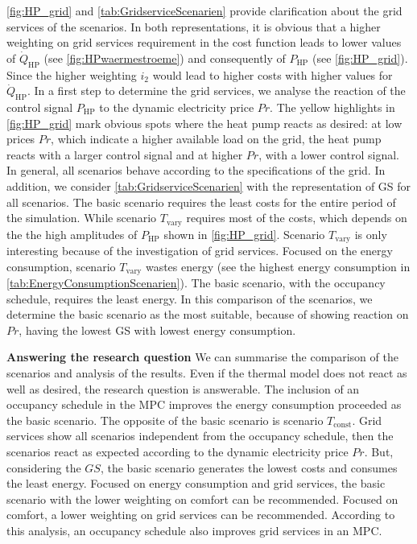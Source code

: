 \autoref{fig:HP_grid} and \autoref{tab:GridserviceScenarien} provide clarification about the grid services of the scenarios. In both representations, it is obvious that a higher weighting on grid services requirement in the cost function leads to lower values of $\dot{Q}_\text{HP}$ (see \autoref{fig:HPwaermestroeme}) and consequently of $P_\text{HP}$ (see \autoref{fig:HP_grid}). Since the higher weighting $i_\text{2}$ would lead to higher costs with higher values for $\dot{Q}_\text{HP}$. In a first step to determine the grid services, we analyse the reaction of the control signal $P_\text{HP}$ to the dynamic electricity price $Pr$. The yellow highlights in \autoref{fig:HP_grid} mark obvious spots where the heat pump reacts as desired: at low prices $Pr$, which indicate a higher available load on the grid, the heat pump reacts with a larger control signal and at higher $Pr$, with a lower control signal. In general, all scenarios behave according to the specifications of the grid. In addition, we consider \autoref{tab:GridserviceScenarien} with the representation of GS for all scenarios. The basic scenario requires the least costs for the entire period of the simulation. While scenario $T_\text{vary}$ requires most of the costs, which depends on the the high amplitudes of $P_\text{HP}$ shown in \autoref{fig:HP_grid}. Scenario $T_\text{vary}$ is only interesting because of the investigation of grid services. Focused on the energy consumption, scenario $T_\text{vary}$ wastes energy (see the highest energy consumption in \autoref{tab:EnergyConsumptionScenarien}). The basic scenario, with the occupancy schedule, requires the least energy. In this comparison of the scenarios, we determine the basic scenario as the most suitable, because of showing reaction on $Pr$, having the lowest GS with lowest energy consumption.\newline

\textbf{Answering the research question}\newline
We can summarise the comparison of the scenarios and analysis of the results. Even if the thermal model does not react as well as desired, the research question is answerable. The inclusion of an occupancy schedule in the MPC improves the energy consumption proceeded as the basic scenario. The opposite of the basic scenario is scenario $T_\text{const}$. Grid services show all scenarios independent from the occupancy schedule, then the scenarios react as expected according to the dynamic electricity price $Pr$. But, considering the $GS$, the basic scenario generates the lowest costs and consumes the least energy. Focused on energy consumption and grid services, the basic scenario with the lower weighting on comfort can be recommended. Focused on comfort, a lower weighting on grid services can be recommended. According to this analysis, an occupancy schedule also improves grid services in an MPC.

